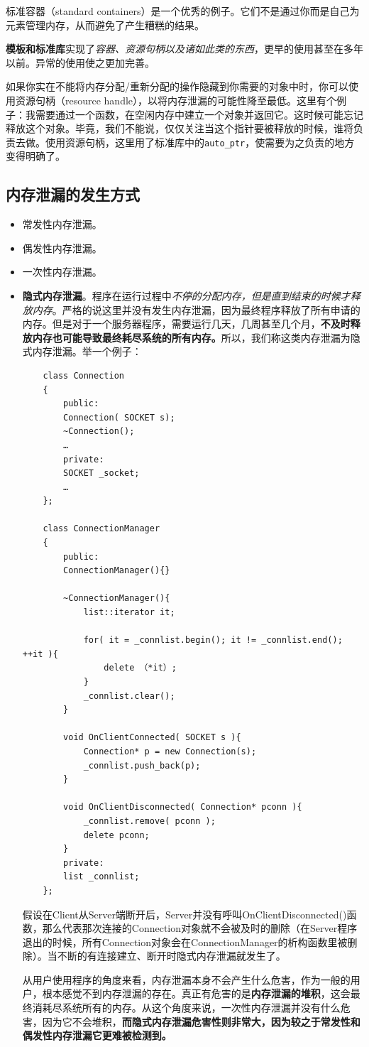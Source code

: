 \documentclass[UTF8,a4paper,12pt]{ctexbook}
\begin{document}
			标准容器（standard containers）是一个优秀的例子。它们不是通过你而是自己为元素管理内存，从而避免了产生糟糕的结果。
			
			\textbf{模板和标准库}实现了\textit{容器、资源句柄以及诸如此类的东西}，更早的使用甚至在多年以前。异常的使用使之更加完善。
			
			如果你实在不能将内存分配/重新分配的操作隐藏到你需要的对象中时，你可以使用资源句柄（resource handle），以将内存泄漏的可能性降至最低。这里有个例子：我需要通过一个函数，在空闲内存中建立一个对象并返回它。这时候可能忘记释放这个对象。毕竟，我们不能说，仅仅关注当这个指针要被释放的时候，谁将负责去做。使用资源句柄，这里用了标准库中的\verb|auto_ptr|，使需要为之负责的地方变得明确了。
			
		\subsection{内存泄漏的发生方式}
			\begin{itemize}
				\item 常发性内存泄漏。
				\item 偶发性内存泄漏。
				\item 一次性内存泄漏。
				\item \textbf{隐式内存泄漏}。程序在运行过程中\textit{不停的分配内存，但是直到结束的时候才释放内存}。严格的说这里并没有发生内存泄漏，因为最终程序释放了所有申请的内存。但是对于一个服务器程序，需要运行几天，几周甚至几个月，\textbf{不及时释放内存也可能导致最终耗尽系统的所有内存。}所以，我们称这类内存泄漏为隐式内存泄漏。举一个例子：
				\begin{lstlisting}
	class Connection
	{
		public:
		Connection( SOCKET s);
		~Connection();	
		…	
		private:
		SOCKET _socket;
		…	
	};
	
	class ConnectionManager	
	{
		public:
		ConnectionManager(){}
		
		~ConnectionManager(){
			list::iterator it;
			
			for( it = _connlist.begin(); it != _connlist.end(); ++it ){
				delete （*it）;
			}
			_connlist.clear();
		}
		
		void OnClientConnected( SOCKET s ){
			Connection* p = new Connection(s);
			_connlist.push_back(p);
		}
		
		void OnClientDisconnected( Connection* pconn ){
			_connlist.remove( pconn );
			delete pconn;	
		}
		private:
		list _connlist;	
	};
				\end{lstlisting}
				假设在Client从Server端断开后，Server并没有呼叫OnClientDisconnected()函数，那么代表那次连接的Connection对象就不会被及时的删除（在Server程序退出的时候，所有Connection对象会在ConnectionManager的析构函数里被删除）。当不断的有连接建立、断开时隐式内存泄漏就发生了。
				
				从用户使用程序的角度来看，内存泄漏本身不会产生什么危害，作为一般的用户，根本感觉不到内存泄漏的存在。真正有危害的是\textbf{内存泄漏的堆积}，这会最终消耗尽系统所有的内存。从这个角度来说，一次性内存泄漏并没有什么危害，因为它不会堆积，\textbf{而隐式内存泄漏危害性则非常大，因为较之于常发性和偶发性内存泄漏它更难被检测到。}
				
			\end{itemize}
\end{document}
